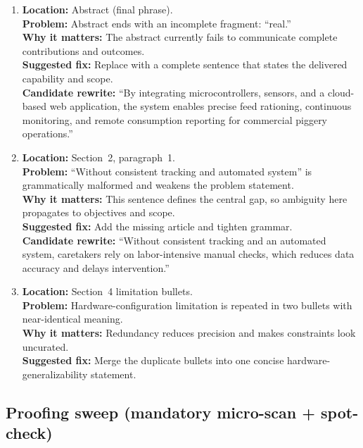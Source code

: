 \documentclass[11pt]{article}
\begin{document}
\begin{enumerate}[leftmargin=*]
  \item \textbf{Location:} Abstract (final phrase).\\
        \textbf{Problem:} Abstract ends with an incomplete fragment: ``real.''\\
        \textbf{Why it matters:} The abstract currently fails to communicate complete contributions and outcomes.\\
        \textbf{Suggested fix:} Replace with a complete sentence that states the delivered capability and scope.\\
        \textbf{Candidate rewrite:} ``By integrating microcontrollers, sensors, and a cloud-based web application, the system enables precise feed rationing, continuous monitoring, and remote consumption reporting for commercial piggery operations.''

  \item \textbf{Location:} Section~2, paragraph~1.\\
        \textbf{Problem:} ``Without consistent tracking and automated system'' is grammatically malformed and weakens the problem statement.\\
        \textbf{Why it matters:} This sentence defines the central gap, so ambiguity here propagates to objectives and scope.\\
        \textbf{Suggested fix:} Add the missing article and tighten grammar.\\
        \textbf{Candidate rewrite:} ``Without consistent tracking and an automated system, caretakers rely on labor-intensive manual checks, which reduces data accuracy and delays intervention.''

  \item \textbf{Location:} Section~4 limitation bullets.\\
        \textbf{Problem:} Hardware-configuration limitation is repeated in two bullets with near-identical meaning.\\
        \textbf{Why it matters:} Redundancy reduces precision and makes constraints look uncurated.\\
        \textbf{Suggested fix:} Merge the duplicate bullets into one concise hardware-generalizability statement.
\end{enumerate}

\subsection*{Proofing sweep (mandatory micro-scan + spot-check)}
\end{document}

